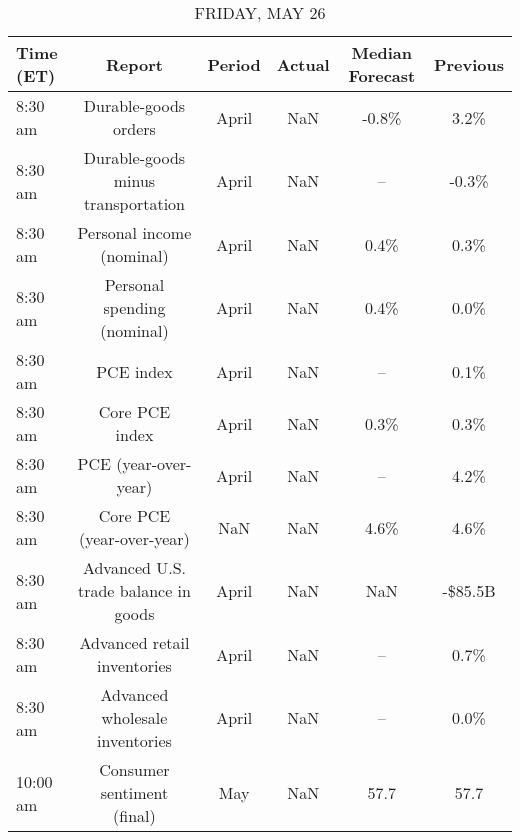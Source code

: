 \documentclass{article}%
\begin{document}
\begin{table}[htbp]%
\caption{FRIDAY, MAY 26}%
\centering%
\begin{adjustbox}{width=1\textwidth}%
\begin{tabular}{lccccc}
\toprule
Time (ET) &                               Report & Period & Actual & Median Forecast & Previous \\
\midrule
  8:30 am &                 Durable-goods orders &  April &    NaN &           -0.8\% &     3.2\% \\
  8:30 am &   Durable-goods minus transportation &  April &    NaN &              -- &    -0.3\% \\
  8:30 am &            Personal income (nominal) &  April &    NaN &            0.4\% &     0.3\% \\
  8:30 am &          Personal spending (nominal) &  April &    NaN &            0.4\% &     0.0\% \\
  8:30 am &                            PCE index &  April &    NaN &              -- &     0.1\% \\
  8:30 am &                       Core PCE index &  April &    NaN &            0.3\% &     0.3\% \\
  8:30 am &                 PCE (year-over-year) &  April &    NaN &              -- &     4.2\% \\
  8:30 am &            Core PCE (year-over-year) &    NaN &    NaN &            4.6\% &     4.6\% \\
  8:30 am & Advanced U.S. trade balance in goods &  April &    NaN &             NaN &  -\$85.5B \\
  8:30 am &          Advanced retail inventories &  April &    NaN &              -- &     0.7\% \\
  8:30 am &       Advanced wholesale inventories &  April &    NaN &              -- &     0.0\% \\
 10:00 am &           Consumer sentiment (final) &    May &    NaN &            57.7 &     57.7 \\
\bottomrule
\end{tabular}
%
\end{adjustbox}%
\end{table}
\end{document}
